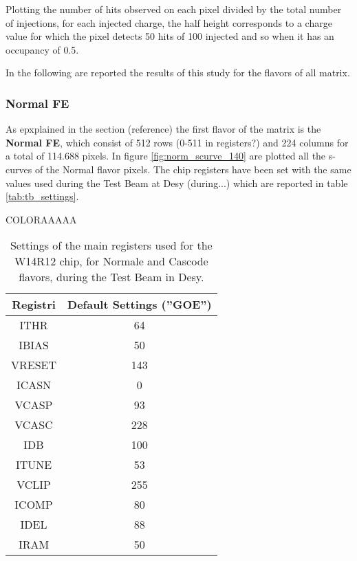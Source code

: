 Plotting the number of hits observed on each pixel divided by the total number of injections, for each injected charge, the half height corresponds to a charge value for which the pixel detects 50 hits of 100 injected and so when it has an occupancy of 0.5.



\begin{comment}
\begin{figure}
\centering
\texttt{[image: ]}
\caption{An example of the S-Curve and the evluation of the threshold.}
\label{ex_scurve}
\end{figure}
\end{comment}

In the following are reported the results of this study for the flavors of all matrix.

\subsubsection{Normal FE}

As epxplained in the section (reference) the first flavor of the matrix is the \textbf{Normal FE}, which consist of 512 rows (0-511 in registers?) and 224 columns for a total of 114.688 pixels. In figure \vref{fig:norm_scurve_140} are plotted all the s-curves of the Normal flavor pixels. The chip registers have been set with the same values used during the Test Beam at Desy (during...) which are reported in table \vref{tab:tb_settings}.

COLORAAAAA

\begin{table}[h!]
\centering
\begin{tabular}{c|c}
Registri & Default Settings (''GOE'') \\
\hline
ITHR & 64 \\
\hline
IBIAS & 50 \\
\hline
VRESET & 143 \\
\hline
ICASN & 0 \\
\hline
VCASP & 93 \\
\hline
VCASC & 228 \\
\hline
IDB & 100 \\
\hline
ITUNE & 53 \\
\hline
VCLIP & 255 \\
\hline
ICOMP & 80 \\
\hline
IDEL & 88 \\
\hline
IRAM & 50 \\
\hline
\end{tabular}
\caption{Settings of the main registers used for the W14R12 chip, for Normale and Cascode flavors, during the Test Beam in Desy.}
\label{tab:tb_settings}
\end{table}

